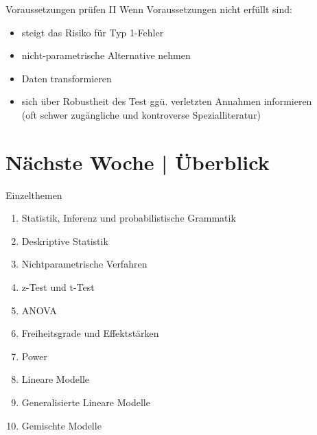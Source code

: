 \begin{frame}
  {Voraussetzungen prüfen II}
  Wenn Voraussetzungen nicht erfüllt sind:
  \begin{itemize}[<+->]
    \item steigt das Risiko für Typ 1-Fehler
    \item nicht-parametrische Alternative nehmen
    \item Daten transformieren
    \item sich über Robustheit des Test ggü. verletzten Annahmen informieren\\
      (oft schwer zugängliche und kontroverse Spezialliteratur)
  \end{itemize}
\end{frame}


\ifdefined\TITLE
  \section{Nächste Woche | Überblick}

  \begin{frame}
    {Einzelthemen}
    \begin{enumerate}
      \item Statistik, Inferenz und probabilistische Grammatik
      \item Deskriptive Statistik
      \item Nichtparametrische Verfahren
      \item z-Test und t-Test
      \item \alert{ANOVA}
      \item Freiheitsgrade und Effektstärken
      \item Power
      \item Lineare Modelle
      \item Generalisierte Lineare Modelle
      \item Gemischte Modelle
    \end{enumerate}
  \end{frame}
\fi

